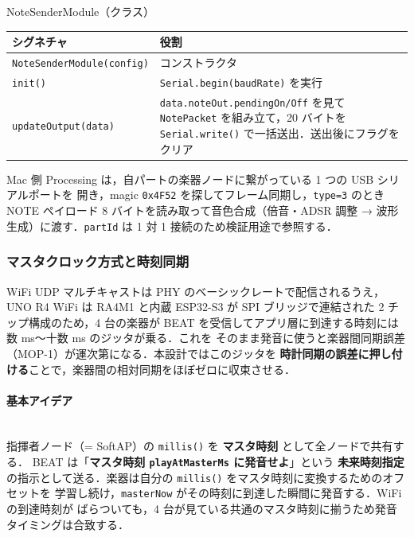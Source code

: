 \documentclass[lualatex,book,paper=a4paper,jafontsize=11.5pt,jafontscale=1.05]{jlreq}
\begin{document}
\begin{apibox}{NoteSenderModule（クラス）}
\begin{tabular}{l p{}}
\toprule
\textbf{シグネチャ} & \textbf{役割} \\
\midrule
\texttt{NoteSenderModule(config)} & コンストラクタ \\
\texttt{init()}                   & \texttt{Serial.begin(baudRate)} を実行 \\
\texttt{updateOutput(data)}       & \texttt{data.noteOut.pendingOn/Off} を見て \texttt{NotePacket} を組み立て，20 バイトを \texttt{Serial.write()} で一括送出．送出後にフラグをクリア \\
\bottomrule
\end{tabular}
\end{apibox}

Mac 側 Processing は，自パートの楽器ノードに繋がっている 1 つの USB シリアルポートを
開き，magic \texttt{0x4F52} を探してフレーム同期し，\texttt{type=3} のとき NOTE ペイロード
8 バイトを読み取って音色合成（倍音・ADSR 調整 → 波形生成）に渡す．\texttt{partId} は
1 対 1 接続のため検証用途で参照する．

\subsubsection{マスタクロック方式と時刻同期}\label{subsec:clock-sync}

WiFi UDP マルチキャストは PHY のベーシックレートで配信されるうえ，UNO R4 WiFi は
RA4M1 と内蔵 ESP32-S3 が SPI ブリッジで連結された 2 チップ構成のため，4 台の楽器が
BEAT を受信してアプリ層に到達する時刻には数 ms〜十数 ms のジッタが乗る．これを
そのまま発音に使うと楽器間同期誤差（MOP-1）が運次第になる．本設計ではこのジッタを
\textbf{時計同期の誤差に押し付ける}ことで，楽器間の相対同期をほぼゼロに収束させる．

\paragraph{基本アイデア}\mbox{}\\
指揮者ノード（= SoftAP）の \texttt{millis()} を \textbf{マスタ時刻} として全ノードで共有する．
BEAT は「\textbf{マスタ時刻 \texttt{playAtMasterMs} に発音せよ}」という \textbf{未来時刻指定}
の指示として送る．楽器は自分の \texttt{millis()} をマスタ時刻に変換するためのオフセットを
学習し続け，\texttt{masterNow} がその時刻に到達した瞬間に発音する．WiFi の到達時刻が
ばらついても，4 台が見ている共通のマスタ時刻に揃うため発音タイミングは合致する．
\end{document}
